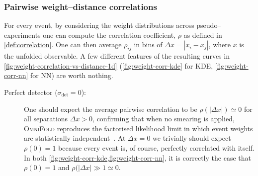         \subsubsection{Pairwise weight--distance correlations}
        For every event, by considering the weight distributions across pseudo--experiments one can compute the correlation coefficient, \(\rho\) as defined in \cref{def:correlation}.
        One can then average $\rho_{ij}$ in bins of $\Delta x = |x_i-x_j|$, where $x$ is the unfolded observable.
            A few different features of the resulting curves in \cref{fig:weight-correlation-vs-distance-1d} (\cref{fig:weight-corr-kde} for {KDE}, \cref{fig:weight-corr-nn} for {NN}) are worth nothing.
            \begin{description}
            \item[Perfect detector ($\sigma_{\det}=0$):] One should expect the average pairwise correlation to be $\rho(|\Delta x|) \simeq 0$ for all separations $\Delta x>0$, confirming that when no smearing is applied, \textsc{OmniFold} reproduces the {factorised likelihood} limit in which event weights are statistically independent~\cite{andreassen_omnifold_2020,Milton:2025mug}.
                At $\Delta x = 0$ we trivially should expect $\rho(0)=1$ because every event is, of course, perfectly correlated with itself.
                In both \cref{fig:weight-corr-kde,fig:weight-corr-nn}, it is correctly the case that \(\rho(0) = 1\) and \(\rho(|\Delta x| \gg 1 \simeq 0.\)
                

\end{description}
